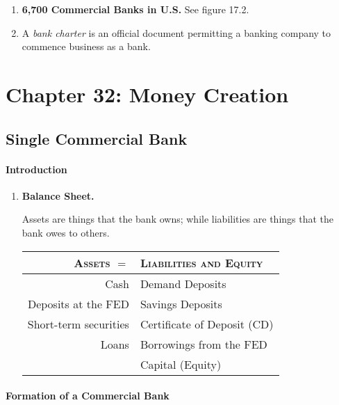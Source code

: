 \begin{enumerate}[label = \textbullet]
	\item \textbf{6,700 Commercial Banks in U.S.} See figure 17.2.

	\item A \emph{bank charter} is an official document permitting a banking company to commence business as a bank.
\end{enumerate}

\section{Chapter 32: Money Creation}

\subsection{Single Commercial Bank}

\paragraph{Introduction}

\begin{enumerate}[label = \textbullet]
	\item \textbf{Balance Sheet.}

		Assets are things that the bank owns; while liabilities are things that the bank owes to others.

		\begin{table}[ht]
			\centering
			\begin{tabular}{r|l}\toprule
				\textsc{Assets} $=$		& \textsc{Liabilities and Equity}	\\ \midrule
				Cash					& Demand Deposits					\\
				Deposits at the FED		& Savings Deposits					\\
				Short-term securities	& Certificate of Deposit (CD)		\\
				Loans					& Borrowings from the FED			\\
										& Capital (Equity)					\\ \bottomrule
			\end{tabular}
		\end{table}
\end{enumerate}

\newpage
\paragraph{Formation of a Commercial Bank}

